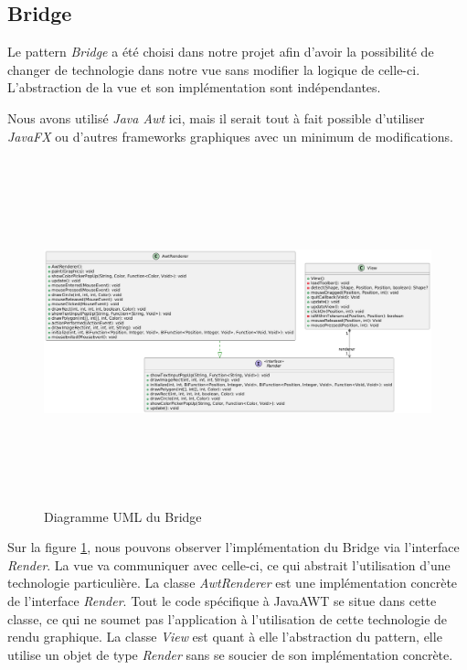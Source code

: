 \documentclass{article}
\begin{document}
\subsection{Bridge}

Le pattern \textit{Bridge} a été choisi dans notre projet afin d'avoir la possibilité de changer de technologie dans notre vue
 sans modifier la logique de celle-ci. L'abstraction de la vue et son implémentation sont indépendantes.

Nous avons utilisé \textit{Java Awt} ici, mais il serait tout à fait possible d'utiliser \textit{JavaFX} ou d'autres frameworks graphiques
avec un minimum de modifications.

\begin{figure}[h]
    \centering
    \includegraphics[width=\textwidth,height=10.0cm,keepaspectratio]{bridge.png}
    \caption{Diagramme UML du Bridge}
    \label{Bridge}
\end{figure}
\FloatBarrier

Sur la figure \ref{Bridge}, nous pouvons observer l'implémentation du Bridge via l'interface \textit{Render}.
La vue va communiquer avec celle-ci, ce qui abstrait l'utilisation d'une technologie particulière.
La classe \textit{AwtRenderer} est une implémentation concrète de l'interface \textit{Render}. 
Tout le code spécifique à JavaAWT se situe dans cette classe, ce qui ne soumet pas l'application à
l'utilisation de cette technologie de rendu graphique.
La classe \textit{View} est quant à elle l'abstraction du pattern, elle utilise un objet de type \textit{Render} sans se soucier de son implémentation concrète.
\end{document}
